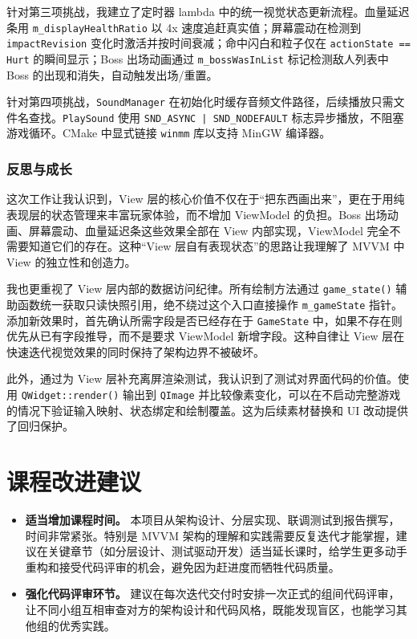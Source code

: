 \documentclass[a4paper]{article}
\begin{document}
\begin{enumerate}
    针对第三项挑战，我建立了定时器 lambda 中的统一视觉状态更新流程。血量延迟条用 \texttt{m\_displayHealthRatio} 以 4x 速度追赶真实值；屏幕震动在检测到 \texttt{impactRevision} 变化时激活并按时间衰减；命中闪白和粒子仅在 \texttt{actionState == Hurt} 的瞬间显示；Boss 出场动画通过 \texttt{m\_bossWasInList} 标记检测敌人列表中 Boss 的出现和消失，自动触发出场/重置。

    针对第四项挑战，\texttt{SoundManager} 在初始化时缓存音频文件路径，后续播放只需文件名查找。\texttt{PlaySound} 使用 \texttt{SND\_ASYNC | SND\_NODEFAULT} 标志异步播放，不阻塞游戏循环。CMake 中显式链接 \texttt{winmm} 库以支持 MinGW 编译器。
\end{enumerate}

\subsubsection{反思与成长}

这次工作让我认识到，View 层的核心价值不仅在于“把东西画出来”，更在于用纯表现层的状态管理来丰富玩家体验，而不增加 ViewModel 的负担。Boss 出场动画、屏幕震动、血量延迟条这些效果全部在 View 内部实现，ViewModel 完全不需要知道它们的存在。这种“View 层自有表现状态”的思路让我理解了 MVVM 中 View 的独立性和创造力。

我也更重视了 View 层内部的数据访问纪律。所有绘制方法通过 \texttt{game\_state()} 辅助函数统一获取只读快照引用，绝不绕过这个入口直接操作 \texttt{m\_gameState} 指针。添加新效果时，首先确认所需字段是否已经存在于 \texttt{GameState} 中，如果不存在则优先从已有字段推导，而不是要求 ViewModel 新增字段。这种自律让 View 层在快速迭代视觉效果的同时保持了架构边界不被破坏。

此外，通过为 View 层补充离屏渲染测试，我认识到了测试对界面代码的价值。使用 \texttt{QWidget::render()} 输出到 \texttt{QImage} 并比较像素变化，可以在不启动完整游戏的情况下验证输入映射、状态绑定和绘制覆盖。这为后续素材替换和 UI 改动提供了回归保护。

\section{课程改进建议}

\begin{itemize}
  \item \textbf{适当增加课程时间。} 本项目从架构设计、分层实现、联调测试到报告撰写，时间非常紧张。特别是 MVVM 架构的理解和实践需要反复迭代才能掌握，建议在关键章节（如分层设计、测试驱动开发）适当延长课时，给学生更多动手重构和接受代码评审的机会，避免因为赶进度而牺牲代码质量。
  \item \textbf{强化代码评审环节。} 建议在每次迭代交付时安排一次正式的组间代码评审，让不同小组互相审查对方的架构设计和代码风格，既能发现盲区，也能学习其他组的优秀实践。
\end{itemize}
\end{document}
